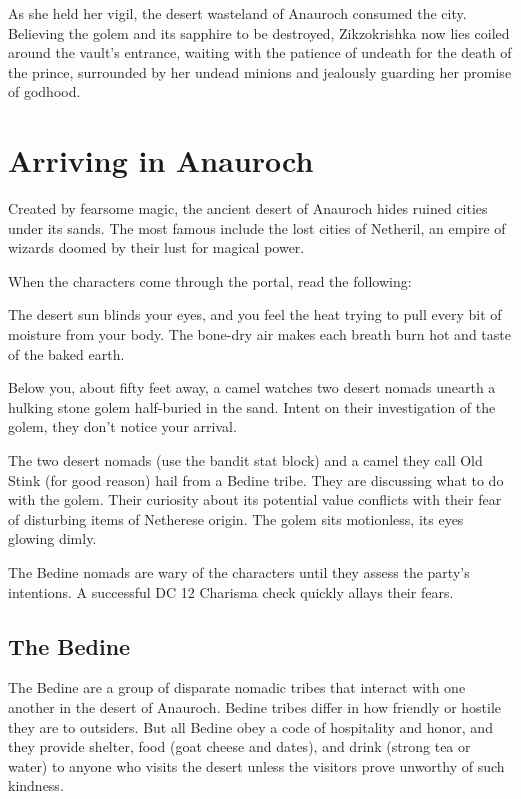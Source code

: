 \documentclass[10pt,a4paper,twoside,bg=print,twocolumn,openany,nodeprecatedcode]{dndbook}
\begin{document}
As she held her vigil, the desert wasteland of Anauroch consumed the city. Believing the golem and its sapphire to be destroyed, Zikzokrishka now lies coiled around the vault's entrance, waiting with the patience of undeath for the death of the prince, surrounded by her undead minions and jealously guarding her promise of godhood.

\section{Arriving in Anauroch}
Created by fearsome magic, the ancient desert of Anauroch hides ruined cities under its sands. The most famous include the lost cities of Netheril, an empire of wizards doomed by their lust for magical power.

When the characters come through the portal, read the following:

\begin{DndReadAloud}{}
The desert sun blinds your eyes, and you feel the heat trying to pull every bit of moisture from your body. The bone-dry air makes each breath burn hot and taste of the baked earth.

Below you, about fifty feet away, a camel watches two desert nomads unearth a hulking stone golem half-buried in the sand. Intent on their investigation of the golem, they don't notice your arrival.

\end{DndReadAloud}

The two desert nomads (use the bandit stat block) and a camel they call Old Stink (for good reason) hail from a Bedine tribe. They are discussing what to do with the golem. Their curiosity about its potential value conflicts with their fear of disturbing items of Netherese origin. The golem sits motionless, its eyes glowing dimly.

The Bedine nomads are wary of the characters until they assess the party's intentions. A successful DC 12 Charisma check quickly allays their fears.

\subsection{The Bedine}
The Bedine are a group of disparate nomadic tribes that interact with one another in the desert of Anauroch. Bedine tribes differ in how friendly or hostile they are to outsiders. But all Bedine obey a code of hospitality and honor, and they provide shelter, food (goat cheese and dates), and drink (strong tea or water) to anyone who visits the desert unless the visitors prove unworthy of such kindness.
\end{document}
